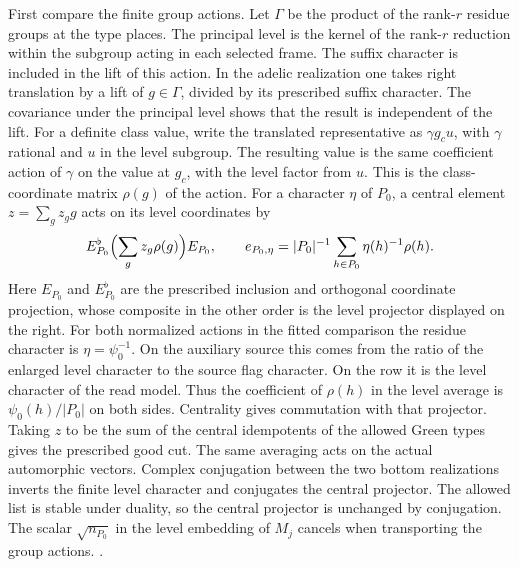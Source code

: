 First compare the finite group actions. Let \(\Gamma\) be the
product of the rank-\(r\) residue groups at the type places. The
principal level is the kernel of the rank-\(r\) reduction within
the subgroup acting in each selected frame. The suffix character
is included in the lift of this action. In the adelic realization
one takes right translation by a lift of \(g\in\Gamma\), divided
by its prescribed suffix character. The covariance under the
principal level shows that the result is independent of the lift.
For a definite class value, write the translated representative as
\(\gamma g_c u\), with \(\gamma\) rational and \(u\) in the level
subgroup. The resulting value is the same coefficient action of
\(\gamma\) on the value at \(g_c\), with the level factor from
\(u\). This is the class-coordinate matrix \(\rho(g)\) of the
action. For a character \(\eta\) of \(P_0\), a central element
\(z=\sum_g z_g g\) acts on its level coordinates by
\[
 E_{P_0}^{\flat}\Bigl(\sum_g z_g\rho(g)\Bigr)E_{P_0},
 \qquad
 e_{P_0,\eta}=|P_0|^{-1}\sum_{h\in P_0}\eta(h)^{-1}\rho(h).
\]
Here \(E_{P_0}\) and \(E_{P_0}^{\flat}\) are the prescribed
inclusion and orthogonal coordinate projection, whose composite
in the other order is the level projector displayed on the right.
For both normalized actions in the fitted comparison the residue
character is \(\eta=\psi_0^{-1}\). On the auxiliary source this comes
from the ratio of the enlarged level character to the source flag
character. On the row it is the level character of the read model.
Thus the coefficient of \(\rho(h)\) in the level average is
\(\psi_0(h)/|P_0|\) on both sides.
Centrality gives commutation with that projector. Taking \(z\) to
be the sum of the central idempotents of the allowed Green types
gives the prescribed good cut. The same averaging acts on the
actual automorphic vectors. Complex conjugation between the two
bottom realizations inverts the finite level character and
conjugates the central projector.
The allowed list is stable under duality, so the central projector
is unchanged by conjugation. The scalar \(\sqrt{n_{P_0}}\) in the
level embedding of \(M_j\) cancels when transporting the group
actions.
.

